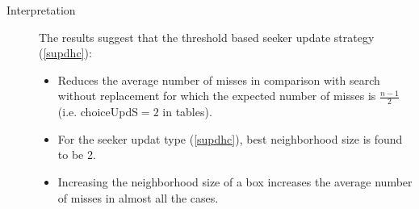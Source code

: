 \documentclass[11pt,a4paper,draft]{article}
\begin{document}
\begin{description}
	\item[Interpretation] The results suggest that the threshold based seeker update strategy (\ref{supdhc}):
	\begin{itemize}
		\item Reduces the average number of misses in comparison with search without replacement for which the expected number of misses is $\frac{n-1}{2}$ (i.e. choiceUpdS$=2$ in tables).
		\item For the seeker updat type (\ref{supdhc}), best neighborhood size is found to be 2. 
		\item Increasing the neighborhood size of a box increases the average number of misses in almost all the cases.
	\end{itemize}
	
\end{description}


	
\end{document}
